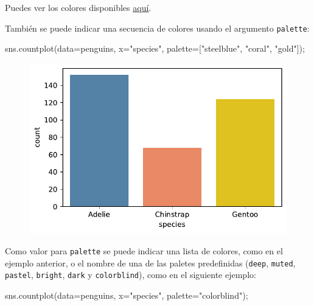 \documentclass[
  a4paper,
  noprof,
  12pt,
  notoc,
  nosols,
  nobib]{mnye}
\newenvironment{Shaded}{\begin{snugshade}}{\end{snugshade}}
\newcommand{\NormalTok}[1]{\textcolor[rgb]{0.00,0.23,0.31}{#1}}
\newcommand{\OperatorTok}[1]{\textcolor[rgb]{0.37,0.37,0.37}{#1}}
\newcommand{\StringTok}[1]{\textcolor[rgb]{0.13,0.47,0.30}{#1}}
\theoremstyle{definition}
\theoremstyle{remark}
\begin{document}
Puedes ver los colores disponibles
\href{https://matplotlib.org/stable/tutorials/colors/colors.html}{aquí}.

También se puede indicar una secuencia de colores usando el argumento
\texttt{palette}:

\begin{Shaded}
\begin{Highlighting}[]
\NormalTok{sns.countplot(data}\OperatorTok{=}\NormalTok{penguins, x}\OperatorTok{=}\StringTok{"species"}\NormalTok{, palette}\OperatorTok{=}\NormalTok{[}\StringTok{"steelblue"}\NormalTok{, }\StringTok{"coral"}\NormalTok{, }\StringTok{"gold"}\NormalTok{])}\OperatorTok{;}
\end{Highlighting}
\end{Shaded}

\begin{figure}[tbph]

{\centering \includegraphics{chapters/1categorical_files/figure-pdf/cell-9-output-1.pdf}

}

\end{figure}

Como valor para \texttt{palette} se puede indicar una lista de colores,
como en el ejemplo anterior, o el nombre de una de las paletes
predefinidas (\texttt{deep}, \texttt{muted}, \texttt{pastel},
\texttt{bright}, \texttt{dark} y \texttt{colorblind}), como en el
siguiente ejemplo:

\begin{Shaded}
\begin{Highlighting}[]
\NormalTok{sns.countplot(data}\OperatorTok{=}\NormalTok{penguins, x}\OperatorTok{=}\StringTok{"species"}\NormalTok{, palette}\OperatorTok{=}\StringTok{"colorblind"}\NormalTok{)}\OperatorTok{;}
\end{Highlighting}
\end{Shaded}
\end{document}
